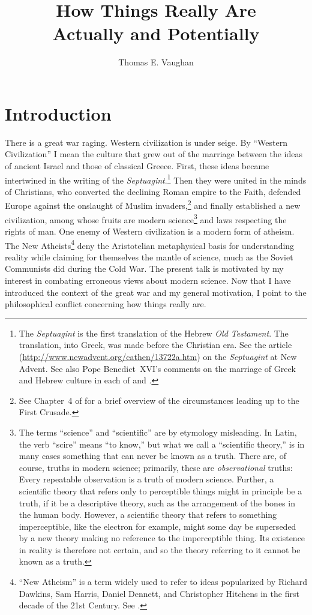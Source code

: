 \documentclass[twocolumn]{article}
\title{How Things Really Are\\{\Large Actually and Potentially}}
\author{Thomas E. Vaughan}
\begin{document}
\maketitle

\section{Introduction}

There is a great war raging.  Western civilization is under seige.  By
``Western Civilization'' I mean the culture that grew out of the marriage
between the ideas of ancient Israel and those of classical Greece.  First,
these ideas became intertwined in the writing of the {\it
Septuagint}.\footnote{%
   The {\it Septuagint} is the first translation of the Hebrew {\it Old
   Testament}.  The translation, into Greek, was made before the Christian era.
   See the article (\url{http://www.newadvent.org/cathen/13722a.htm}) on the
   {\it Septuagint} at New Advent.  See also Pope Benedict~XVI's comments on
   the marriage of Greek and Hebrew culture in each of \cite{r2005} and
   \cite{r2007}.
}
Then they were united in the minds of Christians, who converted the declining
Roman empire to the Faith, defended Europe against the onslaught of Muslim
invaders,\footnote{%
   See Chapter~4 of \cite{b1938} for a brief overview of the circumstances
   leading up to the First Crusade.
}
and finally established a new civilization, among whose fruits are modern
science\footnote{%
   The terms ``science'' and ``scientific'' are by etymology misleading.  In
   Latin, the verb ``scire'' means ``to know,'' but what we call a ``scientific
   theory,'' is in many cases something that can never be known as a truth.
   There are, of course, truths in modern science; primarily, these are
   \emph{observational} truths: Every repeatable observation is a truth of
   modern science.  Further, a scientific theory that refers only to
   perceptible things might in principle be a truth, if it be a descriptive
   theory, such as the arrangement of the bones in the human body.  However, a
   scientific theory that refers to something imperceptible, like the electron
   for example, might some day be superseded by a new theory making no
   reference to the imperceptible thing.  Its existence in reality is therefore
   not certain, and so the theory referring to it cannot be known as a truth.%
}
and laws respecting the rights of man.  One enemy of Western civilization is a
modern form of atheism.  The New Atheists\footnote{%
   ``New Atheism'' is a term widely used to refer to ideas popularized by
   Richard Dawkins, Sam Harris, Daniel Dennett, and Christopher Hitchens in the
   first decade of the 21st Century.  See \cite{f2008}.
}
deny the Aristotelian metaphysical basis for understanding reality while
claiming for themselves the mantle of science, much as the Soviet Communists
did during the Cold War.  The present talk is motivated by my interest in
combating erroneous views about modern science.  Now that I have introduced the
context of the great war and my general motivation, I point to the
philosophical conflict concerning how things really are.
\end{document}
